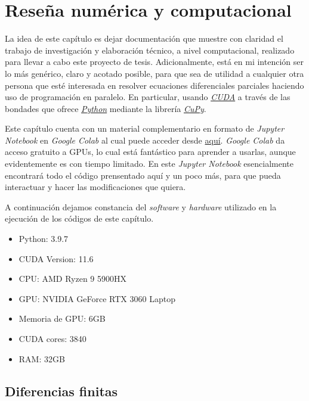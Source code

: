 \chapter{Reseña numérica y computacional}
\graphicspath{{figs/}}
\label{chap:code}

La idea de este capítulo es dejar documentación que muestre con claridad el trabajo de investigación y elaboración técnico, a nivel computacional, realizado 
para llevar a cabo este proyecto de tesis. Adicionalmente, está en mi intención ser lo más genérico, claro y acotado posible, para que sea de utilidad a cualquier 
otra persona que esté interesada en resolver ecuaciones diferenciales parciales haciendo uso de programación en paralelo. En particular, usando 
\href{https://developer.nvidia.com/cuda-toolkit}{\textit{CUDA}} a través de las bondades que ofrece \href{https://www.python.org/}{\textit{Python}} mediante 
la librería \href{https://cupy.dev/}{\textit{CuPy}}.

Este capítulo cuenta con un material complementario en formato de \textit{Jupyter Notebook} en \textit{Google Colab} al cual puede acceder desde 
\href{https://colab.research.google.com/drive/13dfbe0GnIngJ2q3w2jLOlSO6mtFYZmA7?usp=sharing}{aquí}. \textit{Google Colab} da acceso gratuito a GPUs,
lo cual está fantástico para aprender a usarlas, aunque evidentemente es con tiempo limitado. En este \textit{Jupyter Notebook} esencialmente 
encontrará todo el código prensentado aquí y un poco más, para que pueda interactuar y hacer las modificaciones que quiera.

A continuación dejamos constancia del \textit{software} y \textit{hardware} utilizado en la ejecución de los códigos de este capítulo.

\begin{itemize}
  \item Python: 3.9.7
  \item CUDA Version: 11.6
  \item CPU: AMD Ryzen 9 5900HX
  \item GPU: NVIDIA GeForce RTX 3060 Laptop
  \item Memoria de GPU: 6GB
  \item CUDA cores: 3840
  \item RAM: 32GB
\end{itemize}



\section{Diferencias finitas}
\label{S:diferencias finitas}

